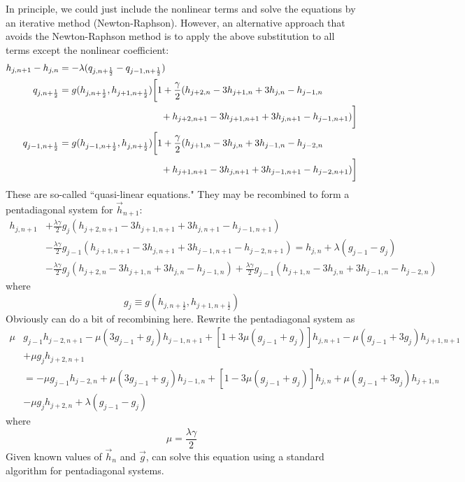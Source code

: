 \documentclass[12pt]{article}
\numberwithin{equation}{section}
\begin{document}
In principle, we could just include the nonlinear terms and solve the equations by an iterative method (Newton-Raphson). However, an alternative approach that avoids the Newton-Raphson method is to apply the above substitution to all terms except the nonlinear coefficient:
\begin{align}
	h_{j, {n+1}}-h_{j,n}
	&=
	- \lambda (q_{j,n+\frac{1}{2}}-q_{j-1,n+\frac{1}{2}})
	\\
	q_{j,n+\frac{1}{2}}
	&=
	g(h_{j,n+\frac{1}{2}}, h_{j+1,n+\frac{1}{2}})
	\bigg[
		1 + \frac{\gamma}{2}(
			h_{j+2,n} - 3 h_{j+1,n}+3 h_{j,n} -  h_{j-1,n}
	\nonumber \\ &\hphantom{=\qquad\qquad\qquad\qquad \qquad}
			+h_{j+2,n+1} - 3 h_{j+1,n+1}+3 h_{j,n+1} -  h_{j-1,n+1})
	\bigg]
	\\
	q_{j-1,n+\frac{1}{2}}
	&=
	g(h_{j-1,n+\frac{1}{2}}, h_{j,n+\frac{1}{2}})
	\bigg[
		1 + \frac{\gamma}{2}(
			h_{j+1,n} - 3 h_{j,n}+3 h_{j-1,n} -  h_{j-2,n}
	\nonumber \\ &\hphantom{=\qquad\qquad\qquad\qquad \qquad}
			+h_{j+1,n+1} - 3 h_{j,n+1}+3 h_{j-1,n+1} -  h_{j-2,n+1})
	\bigg]
\end{align}
These are so-called ``quasi-linear equations." They may be recombined to form a pentadiagonal system for $\vec{h}_{n+1}$:
\begin{align}
	h_{j, {n+1}}
	&+\frac{\lambda \gamma}{2} g_j (
		h_{j+2,n+1} - 3 h_{j+1,n+1}+3 h_{j,n+1} -  h_{j-1,n+1}
	)
	\nonumber \\ 
	&-\frac{\lambda \gamma}{2} g_{j-1} (
		h_{j+1,n+1} - 3 h_{j,n+1}+3 h_{j-1,n+1} -  h_{j-2,n+1}
	)
	=
	h_{j,n}
	+ \lambda(g_{j-1} - g_{j})
	\nonumber \\ 
	&-\frac{\lambda \gamma}{2}g_j (
		h_{j+2,n} - 3 h_{j+1,n}+3 h_{j,n} -  h_{j-1,n}
	) 
	+ \frac{\lambda \gamma}{2}g_{j-1}(
		h_{j+1,n} - 3 h_{j,n}+3 h_{j-1,n} -  h_{j-2,n}
	)
\end{align}
where
\[
	g_j \equiv g(h_{j,n+\frac{1}{2}}, h_{j+1, n+\frac{1}{2}})
\]
Obviously can do a bit of recombining here. Rewrite the pentadiagonal system as
\begin{align}
	\mu& g_{j-1} h_{j-2, n+1}
	-  \mu (3g_{j-1} + g_{j}) h_{j-1,n+1}
	+[1 + 3 \mu ( g_{j-1}+ g_j )]h_{j, {n+1}}
	- \mu (g_{j-1} + 3 g_{j}) h_{j+1,n+1} 
	\nonumber \\ &
	+ \mu g_{j} h_{j+2,n+1} 
	\nonumber \\ 
	&=
	-  \mu  g_{j-1} h_{j-2,n}
	+ \mu (3 g_{j-1}+ g_j ) h_{j-1,n}
	+[1 - 3 \mu (g_{j-1} + g_j)]h_{j,n}
	+ \mu ( g_{j-1}+ 3g_j )h_{j+1,n}
	\nonumber \\ &
	- \mu g_j h_{j+2,n}
	+ \lambda(g_{j-1} - g_{j})
\end{align}
where
\[
	\mu = \frac{\lambda \gamma}{2}
\]
Given known values of $\vec{h}_n$ and $\vec{g}$, can solve this equation using a standard algorithm for pentadiagonal systems.
\end{document}
